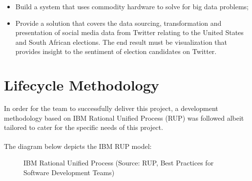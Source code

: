 \documentclass[12pt]{article} %
\begin{document}
		\begin{itemize}
			\item Build a system that uses commodity hardware to solve for big data problems;
			\item Provide a solution that covers the data sourcing, transformation and presentation of social media data from Twitter relating to the United States and South African elections. The end result must be visualization that provides insight to the sentiment of election candidates on Twitter.
		\end{itemize}
		
	
	\section{Lifecycle Methodology}
	
	
	In order for the team to successfully deliver this project, a development methodology based on IBM Rational Unified Process (RUP) was followed albeit tailored to cater for the specific needs of this project.\\
	\\
	The diagram below depicts the IBM RUP model:
	
		\begin{figure}[H] %
			\caption{IBM Rational Unified Process (Source: RUP, Best Practices for Software Development Teams)}
			\label{fig:speciation}
		\end{figure}
		
\end{document}
